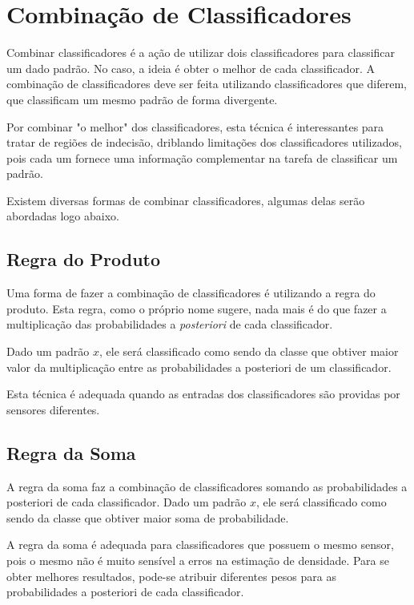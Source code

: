 \section{Combinação de Classificadores}

Combinar classificadores é a ação de utilizar dois classificadores para classificar um dado padrão. No caso, a ideia é obter o melhor de cada classificador. A combinação de classificadores deve ser feita utilizando classificadores que diferem, que classificam um mesmo padrão de forma divergente.

Por combinar "o melhor" dos classificadores, esta técnica é interessantes para tratar de regiões de indecisão, driblando limitações dos classificadores utilizados, pois cada um fornece uma informação complementar na tarefa de classificar um padrão.

Existem diversas formas de combinar classificadores, algumas delas serão abordadas logo abaixo.

\subsection{Regra do Produto}
\label{subsubsec:regradoproduto}

Uma forma de fazer a combinação de classificadores é utilizando a regra do produto. Esta regra, como o próprio nome sugere, nada mais é do que fazer a multiplicação das probabilidades a \textit{posteriori} de cada classificador.

Dado um padrão $x$, ele será classificado como sendo da classe que obtiver maior valor da multiplicação entre as probabilidades a posteriori de um classificador.

Esta técnica é adequada quando as entradas dos classificadores são providas por sensores diferentes.

\subsection{Regra da Soma}
\label{subsubsec:regradasoma}

A regra da soma faz a combinação de classificadores somando as probabilidades a posteriori de cada classificador. Dado um padrão $x$, ele será classificado como sendo da classe que obtiver maior soma de probabilidade.

A regra da soma é adequada para classificadores que possuem o mesmo sensor, pois o mesmo não é muito sensível a erros na estimação de densidade. Para se obter melhores resultados, pode-se atribuir diferentes pesos para as probabilidades a posteriori de cada classificador.

